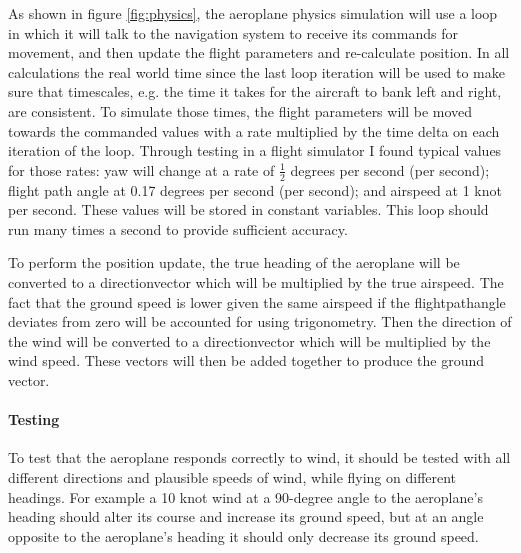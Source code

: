 \documentclass{article}
\begin{document}
As shown in figure \ref{fig:physics}, the aeroplane physics simulation will use a loop in which it will talk to the navigation system to receive its commands for movement, and then update the flight parameters and re-calculate position.
In all calculations the real world time since the last loop iteration will be used to make sure that timescales, e.g. the time it takes for the aircraft to bank left and right, are consistent.
To simulate those times, the flight parameters will be moved towards the commanded values with a rate multiplied by the time delta on each iteration of the loop.
Through testing in a flight simulator I found typical values for those rates: yaw will change at a rate of $\frac{1}{2}$ degrees per second (per second); flight path angle at 0.17 degrees per second (per second); and airspeed at 1 knot per second.
These values will be stored in constant variables.
This loop should run many times a second to provide sufficient accuracy.

To perform the position update, the true heading of the aeroplane will be converted to a \gls{directionvector} which will be multiplied by the true airspeed.
The fact that the ground speed is lower given the same airspeed if the \gls{flightpathangle} deviates from zero will be accounted for using trigonometry.
Then the direction of the wind will be converted to a \gls{directionvector} which will be multiplied by the wind speed.
These vectors will then be added together to produce the ground vector.

\paragraph{Testing}
To test that the aeroplane responds correctly to wind, it should be tested with all different directions and plausible speeds of wind, while flying on different headings.
For example a 10 knot wind at a 90-degree angle to the aeroplane's heading should alter its course and increase its ground speed, but at an angle opposite to the aeroplane's heading it should only decrease its ground speed.
\end{document}
